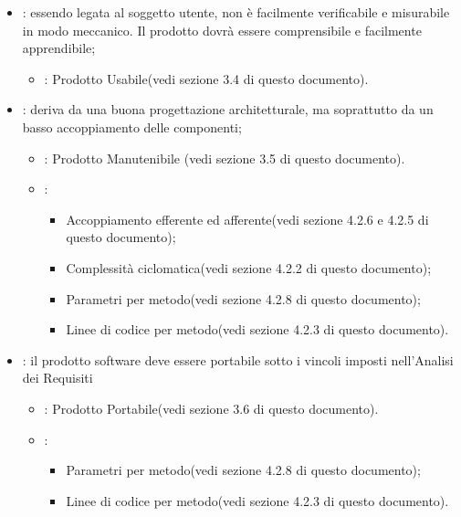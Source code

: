 \begin{itemize}
\item {}: essendo legata al soggetto utente, non è facilmente verificabile e misurabile in modo meccanico. Il prodotto dovrà essere comprensibile e facilmente apprendibile;
\begin{itemize}
\item {}: Prodotto Usabile(vedi sezione 3.4 di questo documento).
\end{itemize}
\item {}: deriva da una buona progettazione architetturale, ma soprattutto da un basso accoppiamento delle componenti;
\begin{itemize}
\item {}: Prodotto Manutenibile (vedi sezione 3.5 di questo documento).
\item {}:
\begin{itemize}
\item Accoppiamento efferente ed afferente(vedi sezione 4.2.6 e 4.2.5 di questo documento);
\item Complessità ciclomatica(vedi sezione 4.2.2 di questo documento);
\item Parametri per metodo(vedi sezione 4.2.8 di questo documento);
\item Linee di codice per metodo(vedi sezione 4.2.3 di questo documento).
\end{itemize}
\end{itemize}
\item {}: il prodotto software deve essere portabile sotto i vincoli imposti nell'Analisi dei Requisiti
\begin{itemize}
\item {}: Prodotto Portabile(vedi sezione 3.6 di questo documento).
\item {}:
\begin{itemize}
\item Parametri per metodo(vedi sezione 4.2.8 di questo documento);
\item Linee di codice per metodo(vedi sezione 4.2.3 di questo documento).
\end{itemize}
\end{itemize}
\end{itemize} 

